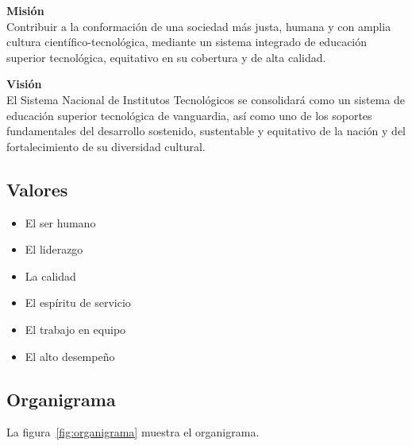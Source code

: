 \parbox[t]{0.48\textwidth}{
{\setlength{\baselineskip}{1.5\baselineskip}
\textbf{Misión}\\
Contribuir a la conformación de una sociedad más justa, humana y con amplia cultura científico-tecnológica, mediante un sistema integrado de educación superior tecnológica, equitativo en su cobertura y de alta calidad.\par}
}\hfill
\parbox[t]{0.48\textwidth}{
{\setlength{\baselineskip}{1.3\baselineskip}
\textbf{Visión}\\
El Sistema Nacional de Institutos Tecnológicos se consolidará como un sistema de educación superior tecnológica de vanguardia, así como uno de los soportes fundamentales del desarrollo sostenido, sustentable y equitativo de la nación y del fortalecimiento de su diversidad cultural.\par}
}

\subsection*{Valores}
\begin{multicols}{3}
\begin{itemize}
\item El ser humano
\item El liderazgo
\item La calidad
\item El espíritu de servicio
\item El trabajo en equipo
\item El alto desempeño
\end{itemize}
\end{multicols}

\subsection*{Organigrama}

La figura~\ref{fig:organigrama} muestra el organigrama.

